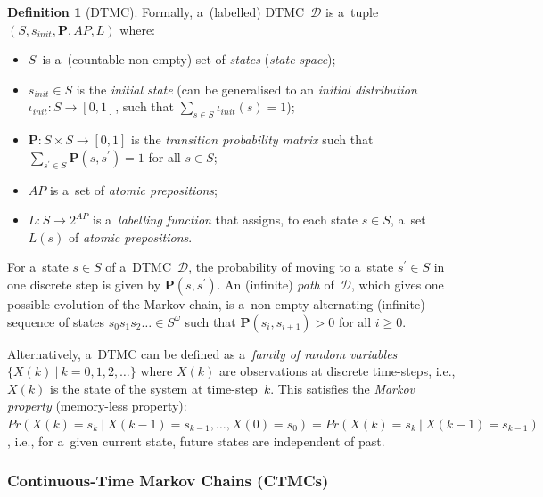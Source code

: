 \documentclass[a4paper, 11pt]{article}
\theoremstyle{definition}
\newtheorem{definition}{Definition}[section]
\begin{document}
\begin{definition}[DTMC]
Formally, a~(labelled) DTMC~$ \mathcal{D} $ is a~tuple $ (S, s_{init},
\boldsymbol{P}, AP, L) $ where:
\begin{itemize}
    \item
        $ S $~is a~(countable non-empty) set of \emph{states}
        (\emph{state-space});

    \item
        $ s_{init} \in S $ is the \emph{initial state} (can be
        generalised to an \emph{initial distribution} $ \iota_{init} : S
        \rightarrow [0, 1] $, such that $ \sum_{s \in S} \iota_{init}(s)
        = 1 $);

    \item
        $ \boldsymbol{P} : S \times S \rightarrow [0, 1] $ is the
        \emph{transition probability matrix} such that $ \sum_{s^\prime
        \in S} \boldsymbol{P}(s, s^\prime) = 1 $ for all $ s \in S $;

    \item
        $ AP $ is a~set of \emph{atomic prepositions};

    \item
        $ L : S \rightarrow 2^{AP} $ is a~\emph{labelling function} that
        assigns, to each state $ s \in S $, a~set $ L(s) $ of
        \emph{atomic prepositions}.
\end{itemize}
\end{definition}

For a~state $ s \in S $ of a~DTMC~$ \mathcal{D} $, the probability of
moving to a~state $ s^\prime \in S $ in one discrete step is given
by $ \boldsymbol{P}(s, s^\prime) $. An (infinite) \emph{path}
of~$ \mathcal{D} $, which gives one possible evolution of the Markov chain,
is a~non-empty alternating (infinite) sequence of states $ s_0 s_1 s_2
\ldots \in S^\omega $ such that $ \boldsymbol{P}(s_i, s_{i + 1}) > 0 $ for
all $ i \geq 0 $.

Alternatively, a~DTMC can be defined as a~\emph{family of random variables}
$ \{X(k)\ |\ k = 0, 1, 2, \ldots\} $ where $ X(k) $ are observations at
discrete time-steps, i.e., $ X(k) $ is the state of the system at
time-step~$ k $. This satisfies the \emph{Markov property} (memory-less
property): $ Pr(X(k) = s_k\ |\ X(k - 1) = s_{k - 1}, \ldots, X(0) = s_0)
= Pr(X(k) = s_k\ |\ X(k - 1) = s_{k - 1}) $, i.e., for a~given current
state, future states are independent of past.

\subsubsection{Continuous-Time Markov Chains (CTMCs)}
\end{document}
